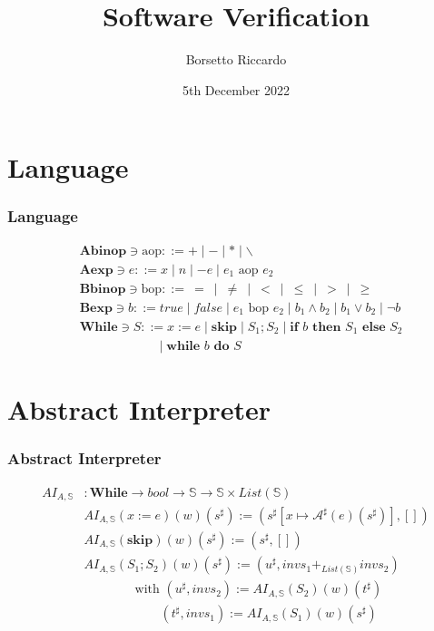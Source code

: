 \documentclass{beamer}
\title{Software Verification}
\author{Borsetto Riccardo}
\institute{Univerisità degli Studi di Padova}
\date{5th December 2022}
\begin{document}
\frame{\titlepage}


\section{Language}

\begin{frame}
    \frametitle{Language}
        \begin{align*}
        &\mathbf { Abinop } \ni \text{aop}::= + \mid - \mid * \mid \backslash  \\
        &\mathbf { Aexp } \ni e::= x \mid n \mid -e \mid e_1 \text { aop } e_2 \\
        &\mathbf { Bbinop } \ni \text{bop}::= \ =\ \mid\ \ne\ \mid\ <\ \mid\ \le\ \mid\ > \ \mid\ \ge\\
        & \mathbf { Bexp } \ni b::=  true  \mid false \mid e_1 \text{ bop } e_2 \mid b_1 \wedge b_2 \mid b_1 \vee b_2 \mid \neg b \\
        & \mathbf { While } \ni S::= x:=e \mid \textbf {skip} \mid S_1 ; S_2 \mid \textbf {if } b \textbf { then } S_1 \textbf { else } S_2\\
         &\qquad \qquad \qquad \mid \textbf {while } b \textbf { do } S
        \end{align*}
\end{frame}

\section{Abstract Interpreter}

\begin{frame}
    \frametitle{Abstract Interpreter}
\begin{align*}
AI_{A, \mathbb{S}}&: \mathbf { While } \to bool \rightarrow \mathbb{S} \rightarrow \mathbb{S} \times List(\mathbb{S}) \\
&AI_{A, \mathbb{S}} (x:=e) (w) (s^{\sharp}) := (s^{\sharp}[x \mapsto \mathcal{A}^{\sharp} (e) (s^{\sharp})], []) \\
&AI_{A, \mathbb{S}} (\textbf{skip}) (w) (s^{\sharp}) := (s^{\sharp}, []) \\
&AI_{A, \mathbb{S}} (S_1 ; S_2) (w) (s^{\sharp}) := (u^{\sharp}, invs_1 +_{List(\mathbb{S})} invs_2) \\
& \qquad \qquad \text{with } (u^{\sharp}, invs_2) := AI_{A, \mathbb{S}} (S_2) (w) (t^{\sharp}) \\
& \qquad \qquad \qquad (t^{\sharp}, invs_1) := AI_{A, \mathbb{S}} (S_1) (w) (s^{\sharp})
\end{align*}
\end{frame}
\end{document}
